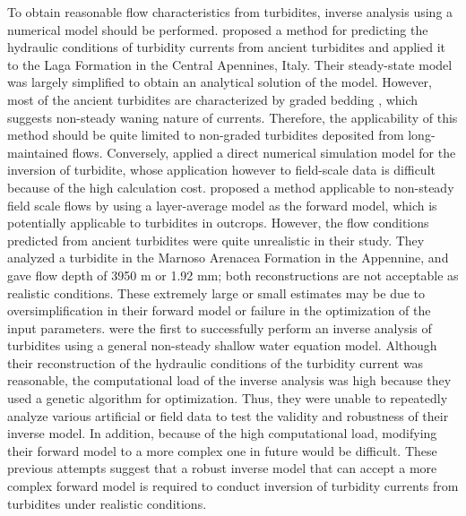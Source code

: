 To obtain reasonable flow characteristics from turbidites, inverse analysis using a numerical model should be performed. \citet{Falcini2009} proposed a method for predicting the hydraulic conditions of turbidity currents from ancient turbidites and applied it to the Laga Formation in the Central Apennines, Italy. Their steady-state model was largely simplified to obtain an analytical solution of the model. However, most of the ancient turbidites are characterized by graded bedding \citep{Bouma1962}, which suggests non-steady waning nature of currents. Therefore, the applicability of this method should be quite limited to non-graded turbidites deposited from long-maintained flows. Conversely, \citet{lesshafft2011towards} applied a direct numerical simulation model for the inversion of turbidite, whose application however to field-scale data is difficult because of the high calculation cost. \citet{Parkinson2017} proposed a method applicable to non-steady field scale flows by using a layer-average model as the forward model, which is potentially applicable to turbidites in outcrops. However, the flow conditions predicted from ancient turbidites were quite unrealistic in their study. They analyzed a turbidite in the Marnoso Arenacea Formation in the Appennine, and gave flow depth of  3950 m or 1.92 mm; both reconstructions are not acceptable as realistic conditions. These extremely large or small estimates may be due to oversimplification in their forward model or failure in the optimization of the input parameters. \citet{Nakao2017} were the first to successfully perform an inverse analysis of turbidites using a general non-steady shallow water equation model. Although their reconstruction of the hydraulic conditions of the turbidity current was reasonable, the computational load of the inverse analysis was high because they used a genetic algorithm for optimization. Thus, they were unable to repeatedly analyze various artificial or field data to test the validity and robustness of their inverse model. In addition, because of the high computational load, modifying their forward model to a more complex one in future would be difficult. These previous attempts suggest that a robust inverse model that can accept a more complex forward model is required to conduct inversion of turbidity currents from turbidites under realistic conditions.

